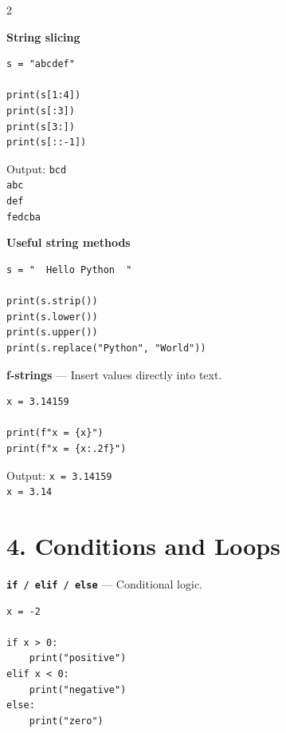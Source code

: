 \documentclass[10pt,a4paper]{article}
\begin{document}
\begin{multicols}{2}
\begin{card}
\textbf{String slicing}

\begin{lstlisting}[style=pythonstyle]
s = "abcdef"

print(s[1:4])
print(s[:3])
print(s[3:])
print(s[::-1])
\end{lstlisting}

Output:
\texttt{bcd}\\
\texttt{abc}\\
\texttt{def}\\
\texttt{fedcba}
\end{card}

\begin{card}
\textbf{Useful string methods}

\begin{lstlisting}[style=pythonstyle]
s = "  Hello Python  "

print(s.strip())
print(s.lower())
print(s.upper())
print(s.replace("Python", "World"))
\end{lstlisting}
\end{card}

\begin{card}
\textbf{f-strings} --- Insert values directly into text.

\begin{lstlisting}[style=pythonstyle]
x = 3.14159

print(f"x = {x}")
print(f"x = {x:.2f}")
\end{lstlisting}

Output:
\texttt{x = 3.14159}\\
\texttt{x = 3.14}
\end{card}

\section*{4. Conditions and Loops}

\begin{card}
\textbf{\texttt{if / elif / else}} --- Conditional logic.

\begin{lstlisting}[style=pythonstyle]
x = -2

if x > 0:
    print("positive")
elif x < 0:
    print("negative")
else:
    print("zero")
\end{lstlisting}


\end{card}
\end{multicols}
\end{document}
